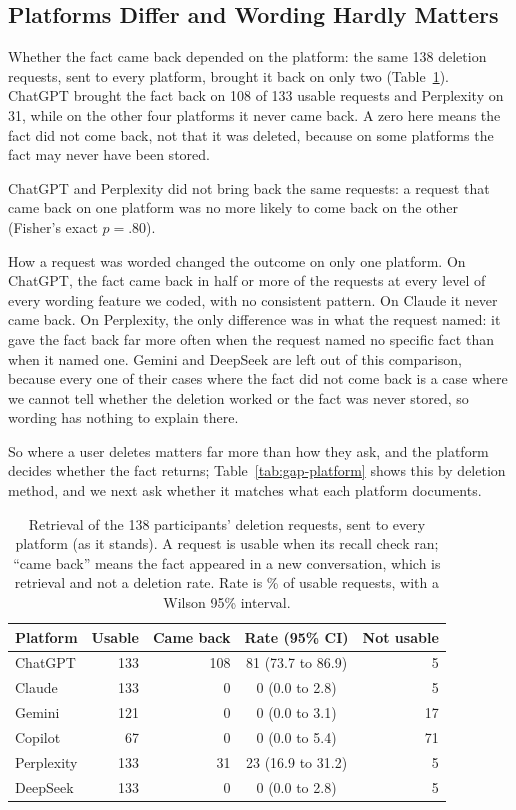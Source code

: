 \documentclass[conference,compsoc]{IEEEtran}
\begin{document}
\subsection{Platforms Differ and Wording Hardly Matters}
\label{sec:audit-platforms}
Whether the fact came back depended on the platform: the same 138 deletion requests, sent to every platform, brought it back on only two (Table~\ref{tab:retrieval}).
ChatGPT brought the fact back on 108 of 133 usable requests and Perplexity on 31, while on the other four platforms it never came back.
A zero here means the fact did not come back, not that it was deleted, because on some platforms the fact may never have been stored.

ChatGPT and Perplexity did not bring back the same requests: a request that came back on one platform was no more likely to come back on the other (Fisher's exact $p=.80$).

How a request was worded changed the outcome on only one platform.
On ChatGPT, the fact came back in half or more of the requests at every level of every wording feature we coded, with no consistent pattern.
On Claude it never came back.
On Perplexity, the only difference was in what the request named: it gave the fact back far more often when the request named no specific fact than when it named one.
Gemini and DeepSeek are left out of this comparison, because every one of their cases where the fact did not come back is a case where we cannot tell whether the deletion worked or the fact was never stored, so wording has nothing to explain there.

So where a user deletes matters far more than how they ask, and the platform decides whether the fact returns; Table~\ref{tab:gap-platform} shows this by deletion method, and we next ask whether it matches what each platform documents.

\begin{table}[t]
\centering
\caption{Retrieval of the 138 participants' deletion requests, sent to every platform (as it stands). A request is usable when its recall check ran; ``came back'' means the fact appeared in a new conversation, which is retrieval and not a deletion rate. Rate is \% of usable requests, with a Wilson 95\% interval.}
\label{tab:retrieval}
\small
\begin{tabular}{lrrcr}
\toprule
Platform & Usable & Came back & Rate (95\% CI) & Not usable \\
\midrule
ChatGPT & 133 & 108 & 81 (73.7 to 86.9) & 5 \\
Claude & 133 & 0 & 0 (0.0 to 2.8) & 5 \\
Gemini & 121 & 0 & 0 (0.0 to 3.1) & 17 \\
Copilot & 67 & 0 & 0 (0.0 to 5.4) & 71 \\
Perplexity & 133 & 31 & 23 (16.9 to 31.2) & 5 \\
DeepSeek & 133 & 0 & 0 (0.0 to 2.8) & 5 \\
\bottomrule
\end{tabular}
\end{table}
\end{document}
